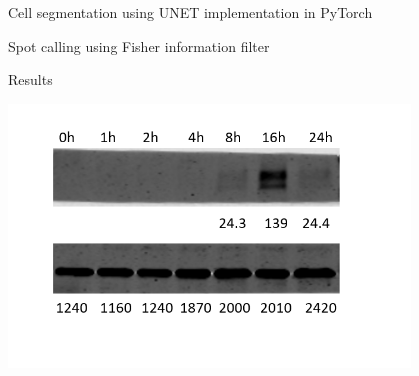 \documentclass[aspectratio=1610]{beamer}					%
\begin{document}
\begin{frame}{Cell segmentation using UNET implementation in PyTorch}
\end{frame}

\begin{frame}{Spot calling using Fisher information filter}
\end{frame}

\begin{frame}{Results}
\begin{center}
\includegraphics[width=0.8\textwidth]{blot.png}
\end{center}
\end{frame}
\end{document}

